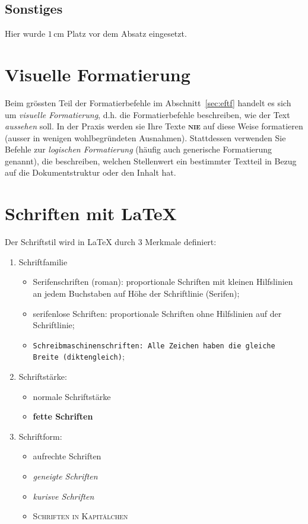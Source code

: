 \documentclass[11pt, a4paper]{article}
\newcommand{\ltx}{\LaTeX}
\begin{document}
\vspace{1cm}
\subsection{Sonstiges} 
Hier wurde $1$\,cm  Platz vor dem Absatz eingesetzt. 
\endgroup
\endgroup

\section{Visuelle Formatierung}
Beim grössten Teil der Formatierbefehle im Abschnitt~\ref{sec:eftf}  handelt es sich um \textit{visuelle Formatierung}, d.h. die Formatierbefehle beschreiben, wie der Text \textit{aussehen} soll. In der Praxis werden sie Ihre Texte \textsc{\textbf{nie}} auf diese Weise formatieren (ausser in wenigen wohlbegründeten Ausnahmen).
Stattdessen verwenden Sie Befehle zur \textit{logischen Formatierung} (häufig auch generische Formatierung genannt), die beschreiben, welchen Stellenwert ein bestimmter Textteil in Bezug auf die Dokumentstruktur oder den Inhalt hat.

\section{Schriften mit \ltx}

Der Schriftstil wird in \ltx{} durch 3 Merkmale definiert:

\begin{enumerate}
\item Schriftfamilie
\begin{itemize}
\item Serifenschriften (roman): proportionale Schriften mit kleinen Hilfslinien an jedem Buchstaben auf H\"ohe der Schriftlinie (Serifen);
\item \textsf{serifenlose Schriften: proportionale Schriften ohne Hilfslinien auf der Schriftlinie};
\item \texttt{Schreibmaschinenschriften: Alle Zeichen haben die gleiche Breite (diktengleich)};
\end{itemize}
\item Schriftst\"arke:
\begin{itemize}
\item normale Schriftstärke
\item \textbf{fette Schriften}
\end{itemize}
\item Schriftform:
\begin{itemize}
\item aufrechte Schriften
\item \textsl{geneigte Schriften}
\item \textit{kurisve Schriften}
\item \textsc{Schriften in Kapitälchen}
\end{itemize}
\end{enumerate}
\end{document}
